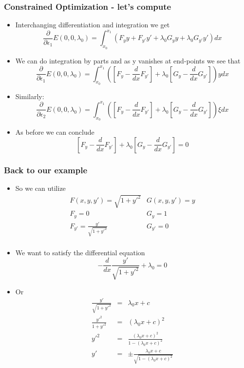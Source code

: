 \documentclass[10pt]{beamer}
\begin{document}
\begin{frame}
  \frametitle{Constrained Optimization - let's compute}
  \begin{itemize}
  \item Interchanging differentiation and integration we get
    \[
      \frac{\partial }{\partial \epsilon_1} E(0,0,\lambda_0) =
      \int_{x_0}^{x_1} \left( F_y y + F_{y'} y' +
        \lambda_0 G_y y + \lambda_0 G_{y'} y' \right) dx
    \]
    \pause
  \item We can do integration by parts and as y vanishes at end-points we see that
    \[
      \frac{\partial }{\partial \epsilon_1} E(0,0,\lambda_0) =
      \int_{x_0}^{x_1} \left( \left[ F_y - \frac{d}{dx} F_{y'} \right]
        + \lambda_0 \left[ G_y - \frac{d}{dx} G_{y'} \right] \right)
      y dx
    \]
    \pause
  \item Similarly:
    \[
      \frac{\partial }{\partial \epsilon_2} E(0,0,\lambda_0) =
      \int_{x_0}^{x_1} \left( \left[ F_y - \frac{d}{dx} F_{y'} \right]
        + \lambda_0 \left[ G_y - \frac{d}{dx} G_{y'} \right] \right)
      \xi dx
    \]
    \pause
  \item As before we can conclude
    \[
      \left[ F_y - \frac{d}{dx} F_{y'} \right]
      + \lambda_0 \left[ G_y - \frac{d}{dx} G_{y'} \right] = 0
    \]
  \end{itemize}
\end{frame}

\begin{frame}
  \frametitle{Back to our example}
  \begin{itemize}
  \item So we can utilize
    \[
      \begin{array}{cc}
        F(x,y,y') = \sqrt{ 1 + y'^2 } & G( x, y, y') = y\\
        F_y = 0 & G_y = 1\\
        F_{y'} = \frac{ y' }{ \sqrt{ 1 + y'^2 } } & G_{y'} = 0\\
      \end{array}
    \]
  \item We want to satisfy the differential equation
    \[
      - \frac{d}{dx} \frac{y'}{ \sqrt{ 1+y'^2 } } + \lambda_0 = 0
    \]
  \item Or
    \[
      \begin{array}{rcl}
        \frac{y'}{\sqrt{1+y'^2}} &=& \lambda_0 x + c   \\
        \frac{y'^2}{1+y'^2} &=& (\lambda_0 x+c)^2\\
        y'^2 &=& \frac{(\lambda_0 x + c)^2}{  1 - (\lambda_0 x +c )^2}\\
        y' & =& \pm \frac{\lambda_0 x + c}{\sqrt{1 - (\lambda_0 x +c )^2}}\\
      \end{array}
    \]
  \end{itemize}
\end{frame}
\end{document}
